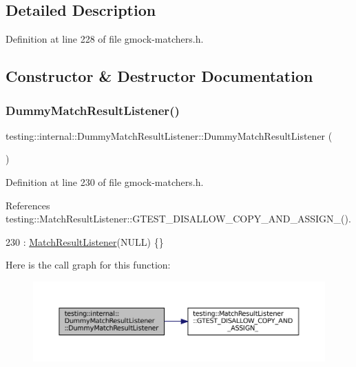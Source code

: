 \subsection{Detailed Description}


Definition at line 228 of file gmock-\/matchers.\+h.



\subsection{Constructor \& Destructor Documentation}
\mbox{\label{classtesting_1_1internal_1_1DummyMatchResultListener_a3284ab25167628be9a92e4ee5d2042fe}} 
\subsubsection{\texorpdfstring{Dummy\+Match\+Result\+Listener()}{DummyMatchResultListener()}}
{\footnotesize\ttfamily testing\+::internal\+::\+Dummy\+Match\+Result\+Listener\+::\+Dummy\+Match\+Result\+Listener (\begin{DoxyParamCaption}{ }\end{DoxyParamCaption})\hspace{0.3cm}{\ttfamily [inline]}}



Definition at line 230 of file gmock-\/matchers.\+h.



References testing\+::\+Match\+Result\+Listener\+::\+G\+T\+E\+S\+T\+\_\+\+D\+I\+S\+A\+L\+L\+O\+W\+\_\+\+C\+O\+P\+Y\+\_\+\+A\+N\+D\+\_\+\+A\+S\+S\+I\+G\+N\+\_\+().


\begin{DoxyCode}
230 : \hyperlink{classtesting_1_1MatchResultListener_a245c360286cd0496d22a4d2fde80eb0b}{MatchResultListener}(NULL) \{\}
\end{DoxyCode}
Here is the call graph for this function\+:
\nopagebreak
\begin{figure}[H]
\begin{center}
\leavevmode
\includegraphics[width=350pt]{classtesting_1_1internal_1_1DummyMatchResultListener_a3284ab25167628be9a92e4ee5d2042fe_cgraph}
\end{center}
\end{figure}


